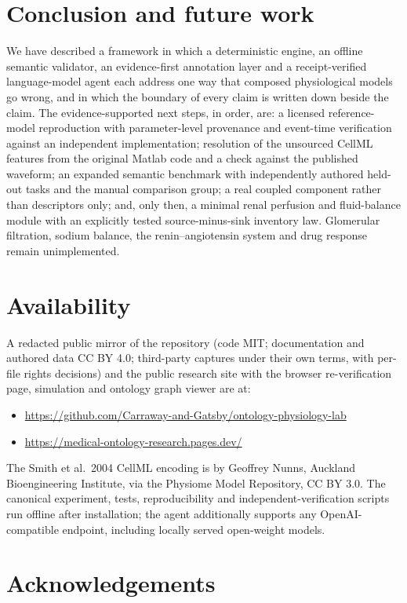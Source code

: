 \documentclass[11pt,letterpaper]{article}
\begin{document}
\section{Conclusion and future work}
\label{sec:conclusion}

We have described a framework in which a deterministic engine, an offline semantic validator, an evidence-first annotation layer and a receipt-verified language-model agent each address one way that composed physiological models go wrong, and in which the boundary of every claim is written down beside the claim. The evidence-supported next steps, in order, are: a licensed reference-model reproduction with parameter-level provenance and event-time verification against an independent implementation; resolution of the unsourced CellML features from the original Matlab code and a check against the published waveform; an expanded semantic benchmark with independently authored held-out tasks and the manual comparison group; a real coupled component rather than descriptors only; and, only then, a minimal renal perfusion and fluid-balance module with an explicitly tested source-minus-sink inventory law. Glomerular filtration, sodium balance, the renin--angiotensin system and drug response remain unimplemented.

\section*{Availability}

A redacted public mirror of the repository (code MIT; documentation and authored data CC BY 4.0; third-party captures under their own terms, with per-file rights decisions) and the public research site with the browser re-verification page, simulation and ontology graph viewer are at:
\begin{itemize}[leftmargin=*]
\item \url{https://github.com/Carraway-and-Gatsby/ontology-physiology-lab}
\item \url{https://medical-ontology-research.pages.dev/}
\end{itemize}
The Smith et al.\ 2004 CellML encoding is by Geoffrey Nunns, Auckland Bioengineering Institute, via the Physiome Model Repository, CC BY 3.0. The canonical experiment, tests, reproducibility and independent-verification scripts run offline after installation; the agent additionally supports any OpenAI-compatible endpoint, including locally served open-weight models.

\section*{Acknowledgements}
\end{document}
